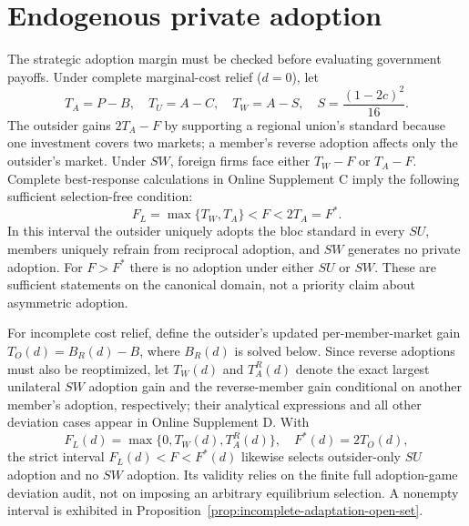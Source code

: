\section{Endogenous private adoption}\label{sec:short-adoption}
The strategic adoption margin must be checked before evaluating government payoffs. Under complete marginal-cost relief ($d=0$), let
\begin{equation}\label{eq:short-thresholds}
T_A=P-B,\quad T_U=A-C,\quad T_W=A-S,\quad S=\frac{(1-2c)^2}{16}.
\end{equation}
The outsider gains $2T_A-F$ by supporting a regional union's standard because one investment covers two markets; a member's reverse adoption affects only the outsider's market. Under $SW$, foreign firms face either $T_W-F$ or $T_A-F$. Complete best-response calculations in Online Supplement C imply the following sufficient selection-free condition:
\begin{equation}\label{eq:short-F-region}
F_L=\max\{T_W,T_A\}<F<2T_A=F^*.
\end{equation}
In this interval the outsider uniquely adopts the bloc standard in every $SU$, members uniquely refrain from reciprocal adoption, and $SW$ generates no private adoption. For $F>F^*$ there is no adoption under either $SU$ or $SW$. These are sufficient statements on the canonical domain, not a priority claim about asymmetric adoption.

For incomplete cost relief, define the outsider's updated per-member-market gain $T_O(d)=B_R(d)-B$, where $B_R(d)$ is solved below. Since reverse adoptions must also be reoptimized, let $T_W(d)$ and $T_A^R(d)$ denote the exact largest unilateral $SW$ adoption gain and the reverse-member gain conditional on another member's adoption, respectively; their analytical expressions and all other deviation cases appear in Online Supplement D. With
\begin{equation}\label{eq:short-F-residual}
F_L(d)=\max\{0,T_W(d),T_A^R(d)\},\quad F^*(d)=2T_O(d),
\end{equation}
the strict interval $F_L(d)<F<F^*(d)$ likewise selects outsider-only $SU$ adoption and no $SW$ adoption. Its validity relies on the finite full adoption-game deviation audit, not on imposing an arbitrary equilibrium selection. A nonempty interval is exhibited in Proposition~\ref{prop:incomplete-adaptation-open-set}.

